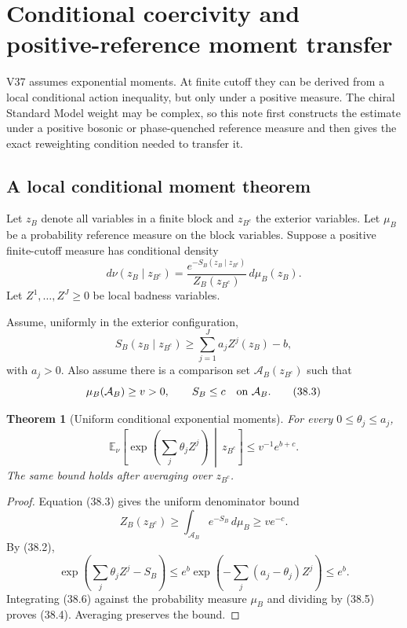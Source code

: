 \documentclass[11pt]{article}
\newtheorem{theorem}{Theorem}[section]
\begin{document}
\section{Conditional coercivity and positive-reference moment transfer}
\label{sec:v11v38}

V37 assumes exponential moments.  At finite cutoff they can be derived
from a local conditional action inequality, but only under a positive
measure.  The chiral Standard Model weight may be complex, so this note
first constructs the estimate under a positive bosonic or
phase-quenched reference measure and then gives the exact reweighting
condition needed to transfer it.

\subsection{A local conditional moment theorem}

Let \(z_B\) denote all variables in a finite block and \(z_{B^c}\) the
exterior variables.  Let \(\mu_B\) be a probability reference measure
on the block variables.  Suppose a positive finite-cutoff measure has
conditional density
\[
 d\nu(z_B\mid z_{B^c})
 =
 \frac{e^{-S_B(z_B\mid z_{B^c})}}
 {Z_B(z_{B^c})}\,d\mu_B(z_B).
 \tag{38.1}
\]
Let \(Z^1,\ldots,Z^J\geq0\) be local badness variables.

Assume, uniformly in the exterior configuration,
\[
 S_B(z_B\mid z_{B^c})
 \geq
 \sum_{j=1}^Ja_jZ^j(z_B)-b,
 \tag{38.2}
\]
with \(a_j>0\).  Also assume there is a comparison set
\(\mathcal A_B(z_{B^c})\) such that
\[
 \mu_B(\mathcal A_B)\geq v>0,
 \qquad
 S_B\leq c
 \quad\hbox{on }\mathcal A_B.
 \tag{38.3}
\]

\begin{theorem}[Uniform conditional exponential moments]
\label{thm:v11v38-conditional-moment}
For every \(0\leq\theta_j\leq a_j\),
\[
 \mathbb E_\nu
 \left[
 \exp\left(\sum_j\theta_jZ^j\right)
 \,\middle|\,z_{B^c}
 \right]
 \leq
 v^{-1}e^{b+c}.
 \tag{38.4}
\]
The same bound holds after averaging over \(z_{B^c}\).
\end{theorem}

\begin{proof}
Equation (38.3) gives the uniform denominator bound
\[
 Z_B(z_{B^c})
 \geq
 \int_{\mathcal A_B}e^{-S_B}\,d\mu_B
 \geq ve^{-c}.
 \tag{38.5}
\]
By (38.2),
\[
 \exp\left(\sum_j\theta_jZ^j-S_B\right)
 \leq
 e^b\exp\left(-\sum_j(a_j-\theta_j)Z^j\right)
 \leq e^b.
 \tag{38.6}
\]
Integrating (38.6) against the probability measure \(\mu_B\) and
dividing by (38.5) proves (38.4).  Averaging preserves the bound.
\end{proof}
\end{document}
